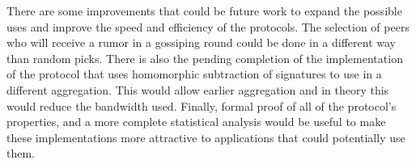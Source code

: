 There are some improvements that could be future work to expand the possible uses and improve the speed and efficiency of the protocols. The selection of peers who will receive a rumor in a gossiping round could be done in a different way than random picks. There is also the pending completion of the implementation of the protocol that uses homomorphic subtraction of signatures to use in a different aggregation. This would allow earlier aggregation and in theory this would reduce the bandwidth used. Finally, formal proof of all of the protocol's properties, and a more complete statistical analysis would be useful to make these implementations more attractive to applications that could potentially use them.